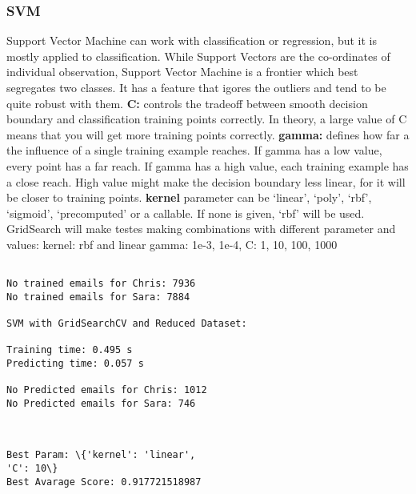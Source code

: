 \documentclass[11pt]{article}
\begin{document}
\begin{multicols}{2}
    \subsubsection{SVM}\label{svm}

Support Vector Machine can work with classification or regression, but
it is mostly applied to classification. While Support Vectors are the
co-ordinates of individual observation, Support Vector Machine is a
frontier which best segregates two classes. It has a feature that igores
the outliers and tend to be quite robust with them. \textbf{C:} controls
the tradeoff between smooth decision boundary and classification
training points correctly. In theory, a large value of C means that you
will get more training points correctly. \textbf{gamma:} defines how far
a the influence of a single training example reaches. If gamma has a low
value, every point has a far reach. If gamma has a high value, each
training example has a close reach. High value might make the decision
boundary less linear, for it will be closer to training points.
\textbf{kernel} parameter can be `linear', `poly', `rbf', `sigmoid',
`precomputed' or a callable. If none is given, `rbf' will be used.
GridSearch will make testes making combinations with different parameter
and values: kernel: rbf and linear gamma: 1e-3, 1e-4, C: 1, 10, 100,
1000

    \begin{Verbatim}[commandchars=\\\{\}]

No trained emails for Chris: 7936
No trained emails for Sara: 7884

SVM with GridSearchCV and Reduced Dataset:

Training time: 0.495 s
Predicting time: 0.057 s

No Predicted emails for Chris: 1012
No Predicted emails for Sara: 746

    \end{Verbatim}

    \begin{center}
    \end{center}
    { \hspace*{\fill} \\}
    
    \begin{Verbatim}[commandchars=\\\{\}]
Best Param: \{'kernel': 'linear', 
'C': 10\}
Best Avarage Score: 0.917721518987


\end{Verbatim}
\end{multicols}
\end{document}
